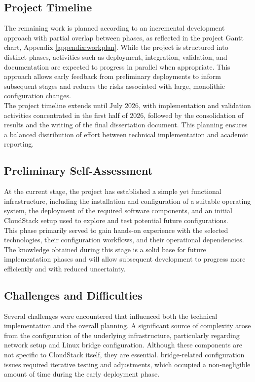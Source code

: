 \documentclass[sigplan]{acmart}
\begin{document}
    \subsection{Project Timeline}
        The remaining work is planned according to an incremental development approach with partial overlap between phases, as reflected in the project Gantt chart, Appendix \ref{appendix:workplan}. While the project is structured into distinct phases, activities such as deployment, integration, validation, and documentation are expected to progress in parallel when appropriate. This approach allows early feedback from preliminary deployments to inform subsequent stages and reduces the risks associated with large, monolithic configuration changes.\\
        
        The project timeline extends until July 2026, with implementation and validation activities concentrated in the first half of 2026, followed by the consolidation of results and the writing of the final dissertation document. This planning ensures a balanced distribution of effort between technical implementation and academic reporting.

    \subsection{Preliminary Self-Assessment}
         At the current stage, the project has established a simple yet functional infrastructure, including the installation and configuration of a suitable operating system, the deployment of the required software components, and an initial CloudStack setup used to explore and test potential future configurations.\\
        
        This phase primarily served to gain hands-on experience with the selected technologies, their configuration workflows, and their operational dependencies. The knowledge obtained during this stage is a solid base for future implementation phases and will allow subsequent development to progress more efficiently and with reduced uncertainty.

    \subsection{Challenges and Difficulties}
        Several challenges were encountered that influenced both the technical implementation and the overall planning. A significant source of complexity arose from the configuration of the underlying infrastructure, particularly regarding network setup and Linux bridge configuration. Although these components are not specific to CloudStack itself, they are essential. bridge-related configuration issues required iterative testing and adjustments, which occupied a non-negligible amount of time during the early deployment phase.\\
        
\end{document}
